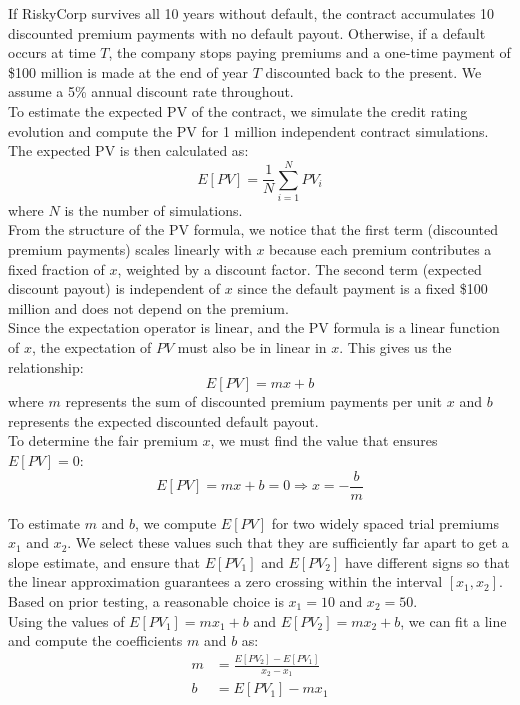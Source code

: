 \documentclass{report}
\begin{document}
If RiskyCorp survives all 10 years without default, the contract accumulates 10 discounted premium payments with no default payout. Otherwise, if a default occurs at time $T$, the company stops paying premiums and a one-time payment of \$100 million is made at the end of year $T$ discounted back to the present. We assume a 5\% annual discount rate throughout. \\

To estimate the expected PV of the contract, we simulate the credit rating evolution and compute the PV for 1 million independent contract simulations. The expected PV is then calculated as:
\[
E[PV]=\frac{1}{N}\sum_{i=1}^{N} PV_i
\]
where $N$ is the number of simulations. \\

From the structure of the PV formula, we notice that the first term (discounted premium payments) scales linearly with $x$ because each premium contributes a fixed fraction of $x$, weighted by a discount factor. The second term (expected discount payout) is independent of $x$ since the default payment is a fixed \$100 million and does not depend on the premium. \\

Since the expectation operator is linear, and the PV formula is a linear function of $x$, the expectation of $PV$ must also be in linear in $x$. This gives us the relationship:
\[
E[PV] = mx + b
\]
where $m$ represents the sum of discounted premium payments per unit $x$ and $b$ represents the expected discounted default payout. \\

To determine the fair premium $x$, we must find the value that ensures $E[PV] = 0$:
\[
E[PV] = mx + b = 0 \Rightarrow x=-\frac{b}{m}
\]

To estimate $m$ and $b$, we compute $E[PV]$ for two widely spaced trial premiums $x_1$ and $x_2$. We select these values such that they are sufficiently far apart to get a slope estimate, and ensure that $E[PV_1]$ and $E[PV_2]$ have different signs so that the linear approximation guarantees a zero crossing within the interval $[x_1, x_2]$. Based on prior testing, a reasonable choice is $x_1 = 10$ and $x_2 = 50$. \\


Using the values of $E[PV_1] = mx_1+b$ and $E[PV_2] = mx_2+b$, we can fit a line and compute the coefficients $m$ and $b$ as:
\begin{align*}
m &= \frac{E[PV_2] - E[PV_1]}{x_2 - x_1} \\
b &= E[PV_1] - mx_1
\end{align*}
\end{document}
